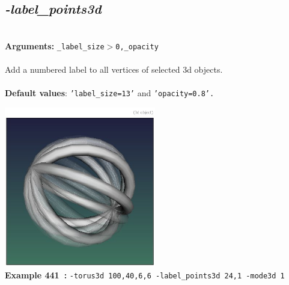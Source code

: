 \documentclass[a4paper,11pt,twoside]{book}
\begin{document}
\subsection{\emph{-label\_points3d} }\vspace*{-0.5em}
~\\\textbf{Arguments: } 
{\small \texttt{\_label\_size$>$0,\_opacity}}\\~\\
Add a numbered label to all vertices of selected 3d objects.
~\\~\\\textbf{Default values}: {\small \texttt{'label\_size=13'} and \texttt{'opacity=0.8'.}}
\begin{center}\includegraphics[keepaspectratio=true,height=7cm,width=\textwidth]{img/gmic_def441.jpg}\\
{\footnotesize \textbf{Example 441~:} \texttt{-torus3d 100,40,6,6 -label\_points3d 24,1 -mode3d 1}}
\end{center}
\end{document}
